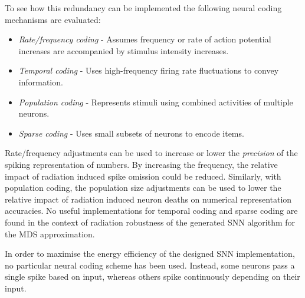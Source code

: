 To see how this redundancy can be implemented the following neural coding mechanisms are evaluated:
\begin{itemize}
    \item \textit{Rate/frequency coding} - Assumes frequency or rate of action potential increases are accompanied by stimulus intensity increases.
    \item \textit{Temporal coding} - Uses high-frequency firing rate fluctuations to convey information. %
    \item \textit{Population coding} - Represents stimuli using combined activities of multiple neurons.%
    \item \textit{Sparse coding} - Uses small subsets of neurons to encode items. %
\end{itemize}
Rate/frequency adjustments can be used to increase or lower the \textit{precision} %
of the spiking representation of numbers. By increasing the frequency, the relative impact of radiation induced spike omission could be reduced. %
Similarly, with population coding, the population size adjustments can be used to lower the relative impact of radiation induced neuron deaths on numerical representation accuracies. No useful implementations for temporal coding and sparse coding are found in the context of radiation robustness of the generated SNN algorithm for the MDS approximation.

In order to maximise the energy efficiency of the designed SNN implementation, no particular neural coding scheme has been used. Instead, some neurons pass a single spike based on input, whereas others spike continuously depending on their input.